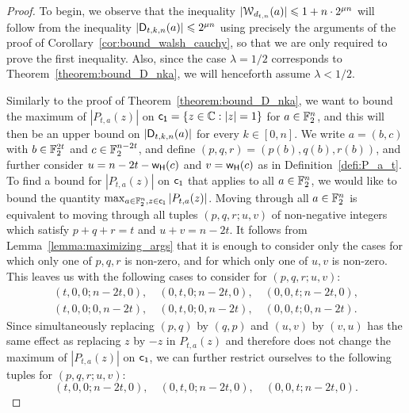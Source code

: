 \documentclass[11pt]{llncs}
\begin{document}
\begin{proof}
    To begin, we observe that the inequality $|\mathcal W_{d_{t,n}}(a)|\leqslant 1+n\cdot 2^{\mu n}$ will follow from the inequality $|\mathsf{D}_{t,k,n}(a)|\leqslant 2^{\mu n}$ using precisely the arguments of the proof of Corollary~\ref{cor:bound_walsh_cauchy}, so that we are only required to prove the first inequality. Also, since the case $\lambda=1/2$ corresponds to Theorem~\ref{theorem:bound_D_nka}, we will henceforth assume $\lambda<1/2$.
    
    Similarly to the proof of Theorem~\ref{theorem:bound_D_nka}, we want to bound the maximum of $|P_{t,a}(z)|$ on $\mathsf{c_1}=\{ z \in \mathbb{C}: |z|=1  \}$ for $a\in\mathbb{F}_2^n$, and this will then be an upper bound on $|\mathsf{D}_{t,k,n}(a)|$ for every $k\in[0,n]$. 
    We write $a=(b,c)$ with $b\in\mathbb{F}_2^{2t}$ and $c\in\mathbb{F}_2^{n-2t}$, and define $(p,q,r)=(p(b),q(b),r(b))$, and further consider $u=n-2t-\mathsf{w_H}(c)$ and $v=\mathsf{w_H}(c)$ as in Definition~\ref{defi:P_a_t}.    
	To find a bound for $|P_{t,a}(z)|$ on $\mathsf{c_1}$ that applies to all $a\in\mathbb{F}_2^n$, we would like to bound the quantity $\max_{a\in\mathbb{F}_2^n,z\in\mathsf{c_1}}|P_{t,a}(z)|$. Moving through all $a\in\mathbb{F}_2^n$ is equivalent to moving through all tuples $(p,q,r;u,v)$ of non-negative integers which satisfy $p+q+r=t$ and $u+v=n-2t$. It follows from Lemma~\ref{lemma:maximizing_args} that it is enough to consider only the cases for which only one of $p,q,r$ is non-zero, and for which only one of $u,v$ is non-zero. 
	This leaves us with the following cases to consider for $(p,q,r;u,v)$:
    \begin{gather*}
        (t,0,0;n-2t,0),\quad(0,t,0;n-2t,0),\quad(0,0,t;n-2t,0),\\
        (t,0,0;0,n-2t),\quad(0,t,0;0,n-2t),\quad(0,0,t;0,n-2t).
    \end{gather*}
    Since simultaneously replacing $(p,q)$ by $(q,p)$ and $(u,v)$ by $(v,u)$ has the same effect as replacing $z$ by $-z$ in $P_{t,a}(z)$ and therefore does not change the maximum of $|P_{t,a}(z)|$ on $\mathsf{c_1}$, we can further restrict ourselves to the following tuples for $(p,q,r;u,v)$:
    \[
        (t,0,0;n-2t,0),\quad(0,t,0;n-2t,0),\quad(0,0,t;n-2t,0).
    \]


\end{proof}
\end{document}
